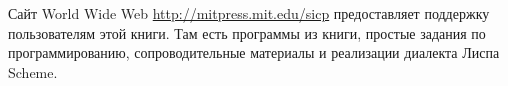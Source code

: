 Сайт World Wide Web \url{http://mitpress.mit.edu/sicp}
предоставляет поддержку
пользователям этой книги.  Там есть программы из книги, простые
задания по программированию, сопроводительные материалы и реализации
диалекта Лиспа Scheme.
{\sloppy

}
